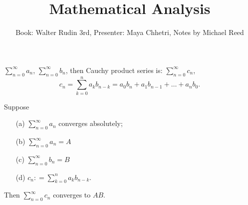 \documentclass[]{article}
\author{Book: Walter Rudin 3rd, Presenter: Maya Chhetri, Notes by Michael Reed}
\title{Mathematical Analysis}
\begin{document}
\maketitle



\begin{recall}
	 $\sum_{n=0}^\infty a_n$, $\sum_{n=0}^\infty b_n$, then Cauchy product series is:
	$\sum_{n=0}^\infty c_n$, 
	$$c_n = \sum_{k=0}^n a_kb_{n-k} = a_0b_n + a_1b_{n-1} + \dots + a_nb_0.$$
\end{recall}

\begin{theorem}
	\label{thm-3-50}
	Suppose
	\begin{enumerate}
		\item[(a)] $\sum_{n=0}^\infty a_n$ converges absolutely;
		\item[(b)] $\sum_{n=0}^\infty a_n = A$
		\item[(c)] $\sum_{n=0}^\infty b_n = B$
		\item[(d)] $c_n: = \sum_{k=0}^n a_kb_{n-k}$.
	\end{enumerate}
	Then $\sum_{n=0}^\infty c_n$ converges to $AB$.
\end{theorem}
\end{document}
